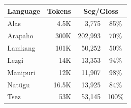 \begin{table}[hb]
    \centering
    \begin{tabular}{l|r|rc}
         \textbf{Language} & \textbf{Tokens} & \multicolumn{2}{c}{\textbf{Seg/Gloss}} \\
         \hline
         Alas & 4.5K & 3,775 & 85\%  \\
         \hline
         Arapaho & 300K & 202,993 & 70\% \\
         \hline
         Lamkang & 101K & 50,252 & 50\% \\
         \hline
         Lezgi & 14K & 13,353  &  94\% \\
         \hline
         Manipuri & 12K & 11,907 & 98\% \\
         \hline
         Natügu & 16.5K & 13,925 &  84\%  \\
         \hline
         Tsez & 53K & 53,145 & 100\%  \\

\end{tabular}
\end{table}
